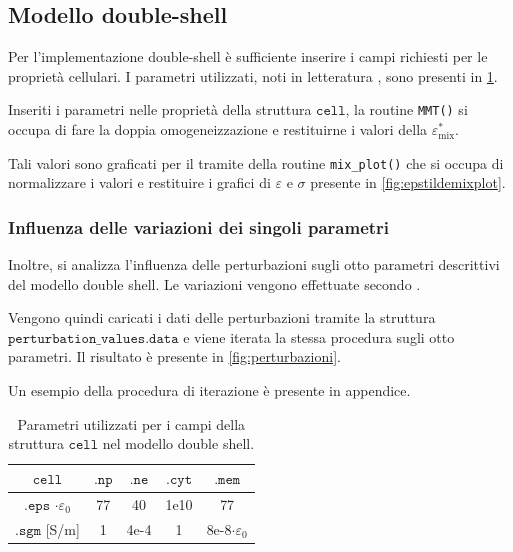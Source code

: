\subsection{Modello double-shell}

Per l'implementazione double-shell è sufficiente inserire i campi richiesti per le proprietà cellulari. I parametri utilizzati, noti in letteratura \cite{irimajiri_dielectric_1979}, sono presenti in \cref{tab:double_shell}.

Inseriti i parametri nelle proprietà della struttura $\mathtt{cell}$, la routine \texttt{MMT()} si occupa di fare la doppia omogeneizzazione e restituirne i valori della $\varepsilon_{\operatorname{mix}}^*$. 

Tali valori sono graficati per il tramite della routine \texttt{mix\_plot()} che si occupa di normalizzare i valori e restituire i grafici di $\varepsilon$ e $\sigma$ presente in \cref{fig:epstildemixplot}.









\subsubsection{Influenza delle variazioni dei singoli parametri}



Inoltre, si analizza l'influenza delle perturbazioni sugli otto parametri descrittivi del modello double shell. Le variazioni vengono effettuate secondo \citeauthor{irimajiri_dielectric_1979} \cite{irimajiri_dielectric_1979}.

Vengono quindi caricati i dati delle perturbazioni tramite la struttura $\mathtt{perturbation\_values.data}$ e viene iterata la stessa procedura sugli otto parametri. Il risultato è presente in \cref{fig:perturbazioni}. 

Un esempio della procedura di iterazione è presente in appendice.

\begin{table}[t!]
	\centering
	\small{
		\begin{tabular}{|c|c|c|c|c|}
			\hline
			$\mathtt{cell}$ & $\mathtt{.np}$  & $\mathtt{.ne}$  &$\mathtt{.cyt}$ & $\mathtt{.mem}$ \\
			\hline
			$\mathtt{.eps}$ $\cdot \varepsilon_0$ &77  & 40 & 1e10 &77  \\
			\hline
			$\mathtt{.sgm}$ [S/m]& 1 & 4e-4 & 1 & 8e-8$\cdot \varepsilon_0$ \\
			\hline
	\end{tabular}}
	\caption{Parametri utilizzati per i campi della struttura $\mathtt{cell}$ nel modello double shell.}
	\label{tab:double_shell}
\end{table}

